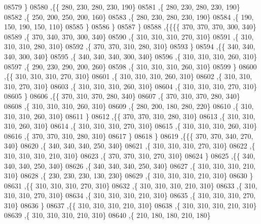 \begin{DoxyCode}
08579     \}
08580    ,\{\{   280,   230,   280,   230,   190\}
08581     ,\{   280,   230,   280,   230,   190\}
08582     ,\{   250,   200,   250,   200,   160\}
08583     ,\{   280,   230,   280,   230,   190\}
08584     ,\{   190,   150,   190,   150,   110\}
08585     \}
08586    \}
08587   \}
08588  ,\{\{\{\{   370,   370,   370,   300,   340\}
08589     ,\{   370,   340,   370,   300,   340\}
08590     ,\{   310,   310,   310,   270,   310\}
08591     ,\{   310,   310,   310,   280,   310\}
08592     ,\{   370,   370,   310,   280,   310\}
08593     \}
08594    ,\{\{   340,   340,   340,   300,   340\}
08595     ,\{   340,   340,   340,   300,   340\}
08596     ,\{   310,   310,   310,   260,   310\}
08597     ,\{   290,   230,   290,   200,   260\}
08598     ,\{   310,   310,   310,   260,   310\}
08599     \}
08600    ,\{\{   310,   310,   310,   270,   310\}
08601     ,\{   310,   310,   310,   260,   310\}
08602     ,\{   310,   310,   310,   270,   310\}
08603     ,\{   310,   310,   310,   260,   310\}
08604     ,\{   310,   310,   310,   270,   310\}
08605     \}
08606    ,\{\{   370,   310,   370,   280,   340\}
08607     ,\{   370,   310,   370,   280,   340\}
08608     ,\{   310,   310,   310,   260,   310\}
08609     ,\{   280,   200,   180,   280,   220\}
08610     ,\{   310,   310,   310,   260,   310\}
08611     \}
08612    ,\{\{   370,   370,   310,   280,   310\}
08613     ,\{   310,   310,   310,   260,   310\}
08614     ,\{   310,   310,   310,   270,   310\}
08615     ,\{   310,   310,   310,   260,   310\}
08616     ,\{   370,   370,   310,   280,   310\}
08617     \}
08618    \}
08619   ,\{\{\{   370,   370,   340,   270,   340\}
08620     ,\{   340,   340,   340,   250,   340\}
08621     ,\{   310,   310,   310,   270,   310\}
08622     ,\{   310,   310,   310,   210,   310\}
08623     ,\{   370,   370,   310,   270,   310\}
08624     \}
08625    ,\{\{   340,   340,   340,   250,   340\}
08626     ,\{   340,   340,   340,   250,   340\}
08627     ,\{   310,   310,   310,   210,   310\}
08628     ,\{   230,   230,   230,   130,   230\}
08629     ,\{   310,   310,   310,   210,   310\}
08630     \}
08631    ,\{\{   310,   310,   310,   270,   310\}
08632     ,\{   310,   310,   310,   210,   310\}
08633     ,\{   310,   310,   310,   270,   310\}
08634     ,\{   310,   310,   310,   210,   310\}
08635     ,\{   310,   310,   310,   270,   310\}
08636     \}
08637    ,\{\{   310,   310,   310,   210,   310\}
08638     ,\{   310,   310,   310,   210,   310\}
08639     ,\{   310,   310,   310,   210,   310\}
08640     ,\{   210,   180,   180,   210,   180\}

\end{DoxyCode}
